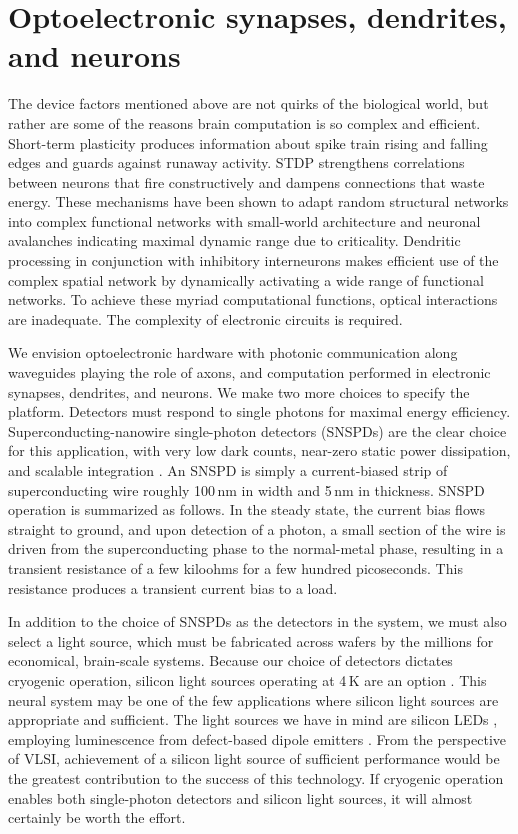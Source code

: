 \documentclass[twocolumn]{article}
\begin{document}
\section{\label{sec:synapsesDendritesAndNeurons}Optoelectronic synapses, dendrites, and neurons}
The device factors mentioned above are not quirks of the biological world, but rather are some of the reasons brain computation is so complex and efficient. Short-term plasticity produces information about spike train rising and falling edges and guards against runaway activity. STDP strengthens correlations between neurons that fire constructively and dampens connections that waste energy. These mechanisms have been shown to adapt random structural networks into complex functional networks with small-world architecture and neuronal avalanches indicating maximal dynamic range due to criticality. Dendritic processing in conjunction with inhibitory interneurons makes efficient use of the complex spatial network by dynamically activating a wide range of functional networks. To achieve these myriad computational functions, optical interactions are inadequate. The complexity of electronic circuits is required. 

We envision optoelectronic hardware with photonic communication along waveguides playing the role of axons, and computation performed in electronic synapses, dendrites, and neurons. We make two more choices to specify the platform. Detectors must respond to single photons for maximal energy efficiency. Superconducting-nanowire single-photon detectors (SNSPDs) are the clear choice for this application, with very low dark counts, near-zero static power dissipation, and scalable integration \cite{shbu2017b}. An SNSPD is simply a current-biased strip of superconducting wire roughly 100\,nm in width and 5\,nm in thickness. SNSPD operation is summarized as follows. In the steady state, the current bias flows straight to ground, and upon detection of a photon, a small section of the wire is driven from the superconducting phase to the normal-metal phase, resulting in a transient resistance of a few kiloohms for a few hundred picoseconds. This resistance produces a transient current bias to a load. 

In addition to the choice of SNSPDs as the detectors in the system, we must also select a light source, which must be fabricated across wafers by the millions for economical, brain-scale systems. Because our choice of detectors dictates cryogenic operation, silicon light sources operating at 4\,K are an option \cite{da1989,shxu2007}. This neural system may be one of the few applications where silicon light sources are appropriate and sufficient. The light sources we have in mind are silicon LEDs \cite{buch2017}, employing luminescence from defect-based dipole emitters \cite{dali1987,absa2018}. From the perspective of VLSI, achievement of a silicon light source of sufficient performance would be the greatest contribution to the success of this technology. If cryogenic operation enables both single-photon detectors and silicon light sources, it will almost certainly be worth the effort.
\end{document}
